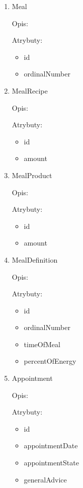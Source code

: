 \begin{enumerate}[label={\textbf{KAT/\protect\threedigits{\theenumi}}}, wide, labelwidth=!, labelindent=0pt]
    \item \label{kat:Meal} Meal

    Opis: \lipsum[1]
    \par
    Atrybuty:
    \begin{itemize}
        \item id
        \item ordinalNumber
    \end{itemize}

    \item \label{kat:MealRecipe} MealRecipe

    Opis: \lipsum[1]
    \par
    Atrybuty:
    \begin{itemize}
        \item id
        \item amount
    \end{itemize}

    \item \label{kat:MealProduct} MealProduct

    Opis: \lipsum[1]
    \par
    Atrybuty:
    \begin{itemize}
        \item id
        \item amount
    \end{itemize}

    \item \label{kat:MealDefinition} MealDefinition

    Opis: \lipsum[1]
    \par
    Atrybuty:
    \begin{itemize}
        \item id
        \item ordinalNumber
        \item timeOfMeal
        \item percentOfEnergy
    \end{itemize}

    \item \label{kat:Appointment} Appointment

    Opis: \lipsum[1]
    \par
    Atrybuty:
    \begin{itemize}
        \item id
        \item appointmentDate
        \item appointmentState
        \item generalAdvice
    \end{itemize}


\end{enumerate}
